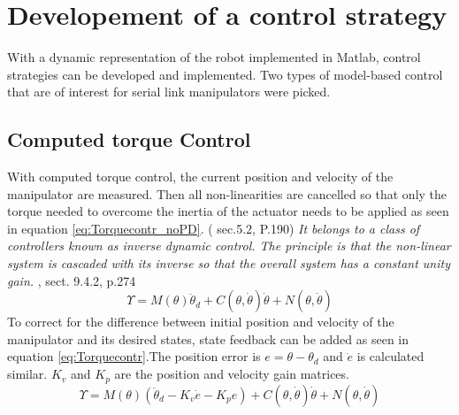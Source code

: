 \chapter{Developement of a control strategy}

With a dynamic representation of the robot implemented in Matlab, control strategies can be developed and implemented. 
Two types of model-based control that are of interest for serial link manipulators were picked.

\section{Computed torque Control}
With computed torque control, the current position and velocity of the manipulator are measured. Then all non-linearities are cancelled so that only the torque needed to overcome the inertia of the actuator needs to be applied as seen in equation \ref{eq:Torquecontr_noPD}. (\cite{MathIntroRobManip} sec.5.2, P.190)
\textit{It belongs to a class of controllers known as inverse dynamic control. The principle is that the non-linear system is cascaded with its inverse so that the overall system has a constant unity gain.} \cite{CorkeRoboticVisionControl}, sect. 9.4.2, p.274\\
\begin{equation}\label{eq:Torquecontr_noPD}
	\Upsilon = M(\theta)\ddot{\theta}_d + C(\theta,\dot{\theta})\dot{\theta} + N(\theta,\dot{\theta})
\end{equation}
To correct for the difference between initial position and velocity of the manipulator and its desired states, state feedback can be added as seen in equation \ref{eq:Torquecontr}.The position error is $e=\theta - \theta_d $ and $\dot{e}$ is calculated similar. $K_v$ and $K_p$ are the position and velocity gain matrices. \cite{MathIntroRobManip}
\begin{equation}\label{eq:Torquecontr}
	\Upsilon = M(\theta)(\ddot{\theta}_d -K_v \dot{e} - K_p e) + C(\theta,\dot{\theta})\dot{\theta} + N(\theta,\dot{\theta})
\end{equation}

